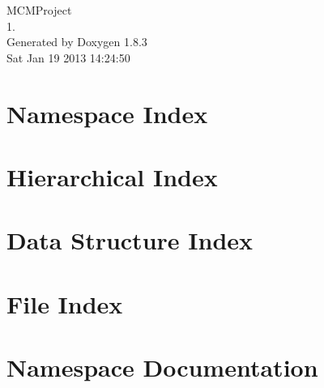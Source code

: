 \documentclass{book}
\begin{document}
\hypersetup{pageanchor=false,citecolor=blue}
\begin{titlepage}
\vspace*{7cm}
\begin{center}
{\Large M\-C\-M\-Project \\[1ex]\large 1. }\\
\vspace*{1cm}
{\large Generated by Doxygen 1.8.3}\\
\vspace*{0.5cm}
{\small Sat Jan 19 2013 14:24:50}\\
\end{center}
\end{titlepage}
\clearemptydoublepage
{}
\tableofcontents
\clearemptydoublepage
{}
\hypersetup{pageanchor=true,citecolor=blue}
\chapter{Namespace Index}

\chapter{Hierarchical Index}

\chapter{Data Structure Index}

\chapter{File Index}

\chapter{Namespace Documentation}










\end{document}
